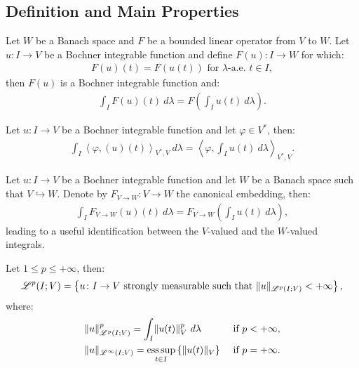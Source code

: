 \newpage
\subsection{Definition and Main Properties}

\begin{corollary}
    Let $W$ be a Banach space and $F$ be a bounded linear operator from $V$ to $W$. Let $u\colon I \rightarrow V$ be a Bochner integrable function and define $F(u) \colon I \rightarrow W$ for which:
    \begin{gather}
        F(u)(t) = F(u(t)) \text{ for } \lambda \text{-a.e. } t \in I,
    \end{gather}
    then $F(u)$ is a Bochner integrable function and:
    \begin{gather}
        \int_I F(u)(t) ~ d \lambda = F\left( \int_I u(t) ~ d \lambda \right).
    \end{gather}
\end{corollary}

\begin{remark} %
    Let $u\colon I \rightarrow V$ be a Bochner integrable function and let $\varphi \in V^*$, then:
    \begin{gather}
        \int_I \left\langle \varphi, (u)(t) \right\rangle_{V^*, V} ~ d \lambda = \left\langle \varphi, \int_I u(t) ~ d \lambda \right\rangle_{V^*, V}.
    \end{gather}
\end{remark}

\begin{remark}[Embedding]
    Let $u\colon I \rightarrow V$ be a Bochner integrable function and let $W$ be a Banach space such that $V \hookrightarrow W$. Denote by $F_{V \rightarrow W} \colon V \rightarrow W$ the canonical embedding, then:
    \begin{gather}
        \int_I F_{V \rightarrow W}(u)(t) ~ d \lambda = F_{V \rightarrow W}\left( \int_I u(t) ~ d \lambda \right),
    \end{gather}
    leading to a useful identification between the $V$-valued and the $W$-valued integrals.
\end{remark}

\begin{definition}[$\SpaceLp{p}(I; V)$]
    Let $1 \leq p \leq +\infty$, then:
    \begin{gather}
        \mathscr{L}^{p}(I; V) = \left\{ u \colon I \rightarrow V \text{ strongly measurable such that } \lVert u \rVert_{\mathscr{L}^{p}(I; V)} < +\infty \right\},
    \end{gather}
    where:
    \begin{align}
        & \lVert u \rVert_{\mathscr{L}^{p}(I; V)}^p = \int_I \lVert u(t) \rVert_V^p ~ d \lambda & \text{ if } p < +\infty, \\
        & \lVert u \rVert_{\mathscr{L}^{\infty}(I; V)} = \operatorname*{ess\,sup}_{t \in I} \left\{ \lVert u(t) \rVert_V \right\} & \text{ if } p = +\infty.
    \end{align}
\end{definition}

